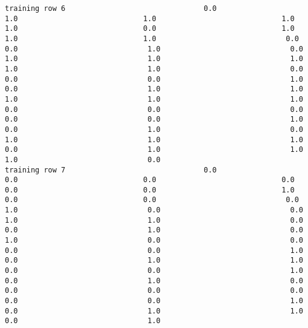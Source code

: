 \documentclass[11pt]{article}
\begin{document}
\begin{verbatim}
training row 6                                0.0                             1.0                             1.0                             1.0                             1.0                             0.0                             1.0                             1.0                             1.0                              0.0                              0.0                              1.0                              0.0                              1.0                              1.0                              1.0                              1.0                              1.0                              0.0                              0.0                              0.0                              1.0                              0.0                              1.0                              1.0                              1.0                              1.0                              1.0                              0.0                              0.0                              0.0                              0.0                              0.0                              1.0                              0.0                              1.0                              0.0                              1.0                              1.0                              1.0                              0.0                              1.0                              1.0                              1.0                              0.0
training row 7                                0.0                             0.0                             0.0                             0.0                             0.0                             0.0                             1.0                             0.0                             0.0                              0.0                              1.0                              0.0                              0.0                              1.0                              1.0                              0.0                              0.0                              1.0                              0.0                              1.0                              0.0                              0.0                              0.0                              0.0                              1.0                              0.0                              1.0                              1.0                              0.0                              0.0                              1.0                              0.0                              1.0                              0.0                              0.0                              0.0                              0.0                              0.0                              0.0                              1.0                              0.0                              1.0                              1.0                              0.0                              1.0

\end{verbatim}
\end{document}
